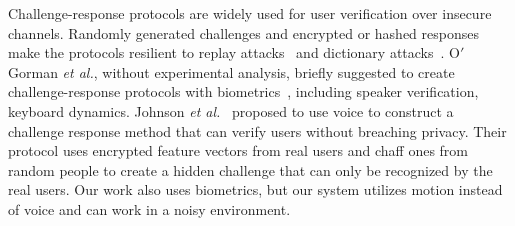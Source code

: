 Challenge-response protocols are widely used for user verification over insecure channels. Randomly  generated challenges and encrypted or hashed responses make the protocols resilient to replay attacks~\cite{Securityforcomputernetworks} and dictionary attacks~\cite{Bellovin92encryptedkey}. %
O$'$Gorman \textit{et al.}, without experimental analysis, briefly suggested to create challenge-response protocols with biometrics~\cite{Gorman2003ComparingPasswords}, including speaker verification, keyboard dynamics.  %
Johnson \textit{et al.}~\cite{johnson2013SPIE} proposed to use voice to construct a challenge response method that can verify users without breaching privacy. Their protocol uses encrypted feature vectors from real users and chaff ones from random people to create a hidden challenge that can only be recognized by the real users. Our work also uses biometrics, but our system utilizes motion instead of voice and can work in a noisy environment. %

 


